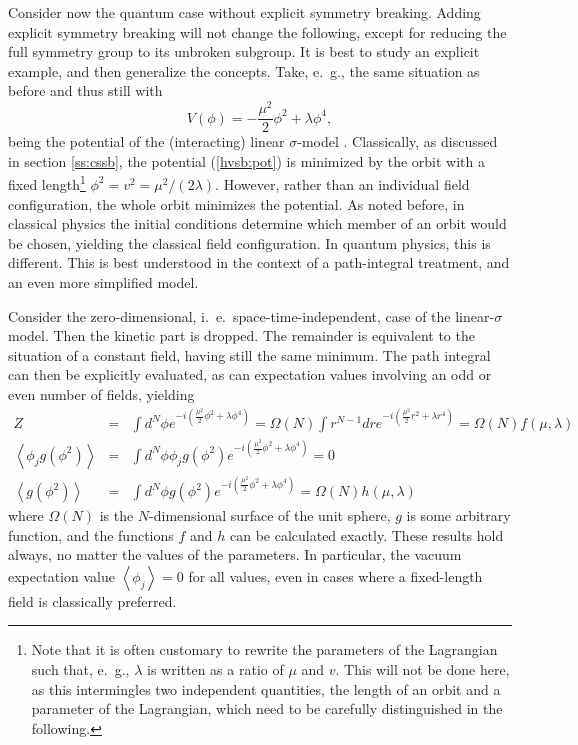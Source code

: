 \documentclass[final,12pt]{article}
\newcommand*{\no}{\noindent}
\newcommand*{\bea}{\begin{eqnarray}}
\newcommand*{\eea}{\end{eqnarray}}
\newcommand*{\be}{\begin{equation}}
\newcommand*{\ee}{\end{equation}}
\newcommand*{\pref}[1]{(\ref{#1})}
\newcommand*{\nn}{\nonumber}
\newcommand*{\1}{1\!\!\!\bot}
\newcommand*{\la}{\left\langle}
\newcommand*{\ra}{\right\rangle}
\begin{document}
Consider now the quantum case \cite{O'Raifeartaigh:1978kv,Sartori:1992ib} without explicit symmetry breaking. Adding explicit symmetry breaking will not change the following, except for reducing the full symmetry group to its unbroken subgroup. It is best to study an explicit example, and then generalize the concepts. Take, e.\ g., the same situation as before and thus still with
\be
V(\phi)=-\frac{\mu^2}{2}\phi^2+\lambda\phi^4\label{hvsb:pot},
\ee
\no being the potential of the (interacting) linear $\sigma$-model \cite{Bohm:2001yx}. Classically, as discussed in section \ref{ss:cssb}, the potential \pref{hvsb:pot} is minimized by the orbit with a fixed length\footnote{Note that it is often customary to rewrite the parameters of the Lagrangian such that, e.\ g., $\lambda$ is written as a ratio of $\mu$ and $v$. This will not be done here, as this intermingles two independent quantities, the length of an orbit and a parameter of the Lagrangian, which need to be carefully distinguished in the following.} $\phi^2=v^2=\mu^2/(2\lambda)$. However, rather than an individual field configuration, the whole orbit minimizes the potential. As noted before, in classical physics the initial conditions determine which member of an orbit would be chosen, yielding the classical field configuration. In quantum physics, this is different. This is best understood in the context of a path-integral treatment, and an even more simplified model.

Consider the zero-dimensional, i.\ e.\ space-time-independent, case of the linear-$\sigma$ model. Then the kinetic part is dropped. The remainder is equivalent to the situation of a constant field, having still the same minimum. The path integral can then be explicitly evaluated, as can expectation values involving an odd or even number of fields, yielding
\bea
Z&=&\int d^N\phi e^{-i\left(\frac{\mu^2}{2}\phi^2+\lambda\phi^4\right)}=\Omega(N)\int r^{N-1}dr e^{-i\left(\frac{\mu^2}{2}r^2+\lambda r^4\right)}=\Omega(N)f(\mu,\lambda)\nn\\
\la\phi_j g(\phi^2)\ra&=&\int d^N\phi \phi_j g(\phi^2) e^{-i\left(\frac{\mu^2}{2}\phi^2+\lambda\phi^4\right)}=0\label{hvsb:vvev}\\
\la g(\phi^2)\ra&=&\int d^N\phi g(\phi^2) e^{-i\left(\frac{\mu^2}{2}\phi^2+\lambda\phi^4\right)}=\Omega(N)h(\mu,\lambda)\nn
\eea
\no where $\Omega(N)$ is the $N$-dimensional surface of the unit sphere, $g$ is some arbitrary function, and the functions $f$ and $h$ can be calculated exactly. These results hold always, no matter the values of the parameters. In particular, the vacuum expectation value $\la\phi_j\ra=0$ for all values, even in cases where a fixed-length field is classically preferred.
\end{document}
